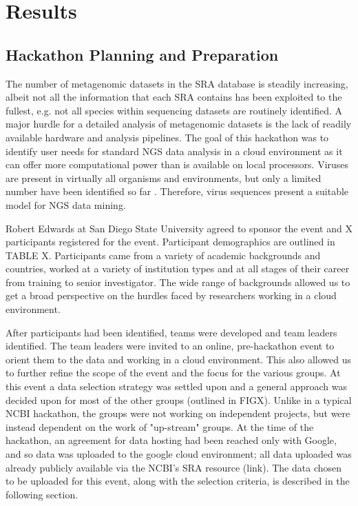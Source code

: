 \section{Results}
  \subsection{Hackathon Planning and Preparation}

  The number of metagenomic datasets in the SRA database is steadily
  increasing, albeit not all the information that each SRA contains has been
  exploited to the fullest, e.g. not all species within sequencing datasets are
  routinely identified. A major hurdle for a detailed analysis of metagenomic
  datasets is the lack of readily available hardware and analysis pipelines.
  The goal of this hackathon was to identify user needs for  standard NGS data
  analysis in a cloud environment as it can offer more computational power than
  is available on local processors. Viruses are present in virtually all
  organisms and environments, but only a limited number have been identified so
  far \cite{Shi2016}. Therefore, virus sequences present a suitable model for
  NGS data mining.


  Robert Edwards at San Diego State University agreed to sponsor the event and
  X participants registered for the event. Participant demographics are
  outlined in TABLE X. Participants came from a variety of academic backgrounds
  and countries, worked at a variety of institution types and at all stages of
  their career from training to senior investigator. The wide range of
  backgrounds allowed us to get a broad perspective on the hurdles faced by
  researchers working in a cloud environment.

  After participants had been identified, teams were developed and team leaders
  identified. The team leaders were invited to an online, pre-hackathon event
  to orient them to the data and working in a cloud environment. This also
  allowed us to further refine the scope of the event and the focus for the
  various groups. At this event a data selection strategy was settled upon and
  a general approach was decided upon for most of the other groups (outlined in
  FIGX). Unlike in a typical NCBI hackathon, the groups were not working on
  independent projects, but were instead dependent on the work of "up-stream"
  groups. At the time of the hackathon, an agreement for data hosting had been
  reached only with Google, and so data was uploaded to the google cloud
  environment; all data uploaded was already publicly available via the NCBI's
  SRA resource (link). The data chosen to be uploaded for this event, along
  with the selection criteria, is described in the following section.


